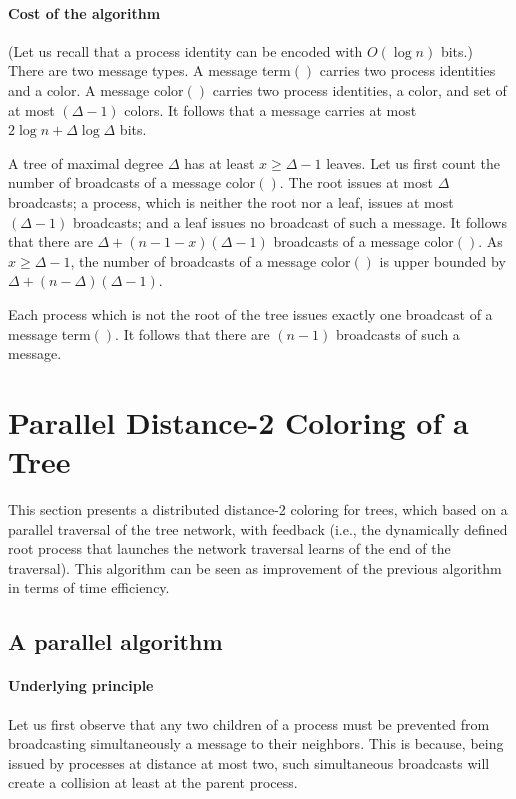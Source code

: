 \documentclass[11pt,english]{article}
\begin{document}
\paragraph{Cost of the algorithm}
(Let us recall that a process identity can be encoded with $O(\log n)$ bits.)
There are two message types. A message {\sc term}$()$ carries two 
process identities and a color. 
A message {\sc color}$()$ carries two process identities, 
a color, and set of at most $(\Delta-1)$ colors. 
It follows that a message carries at most $2\log n + \Delta \log \Delta$ bits. 



A tree of maximal degree $\Delta$ has at least $x\geq \Delta-1$ leaves.  
Let us first count the number of broadcasts of a message  {\sc color}$()$. 
The root issues at most $\Delta$  broadcasts; 
a process, which is neither the root nor a leaf, issues
at most $(\Delta-1)$  broadcasts; and a leaf  issues no broadcast
of such a message. It follows that there are 
$\Delta + (n-1-x)(\Delta-1)$  broadcasts of a message  
{\sc color}$()$. As $x\geq \Delta-1$, the number of broadcasts of 
a message {\sc color}$()$  is upper bounded by $
\Delta + (n-\Delta)(\Delta-1)$.  
 
Each process which is not the root of the tree  issues exactly one 
broadcast  of a message {\sc term}$()$. It follows that there are $(n-1)$
broadcasts  of such a message. 


\section{Parallel Distance-2  Coloring of a Tree}
\label{sec:parallel-d2-tree-algorithm}


This section presents a distributed distance-2 coloring for trees,
which based on a parallel traversal of the tree network, with feedback
(i.e., the dynamically defined root process that launches the network
traversal learns of the end of the traversal).  This algorithm can be
seen as improvement of the previous algorithm in terms of time
efficiency.



\subsection{A parallel algorithm}
\paragraph{Underlying principle}
Let us first observe that any two children of a process must be prevented 
from  broadcasting simultaneously a message to their neighbors. 
This is because, being issued by processes at  distance at most two, 
such simultaneous broadcasts will create a collision at least at the
parent process. 
\end{document}
